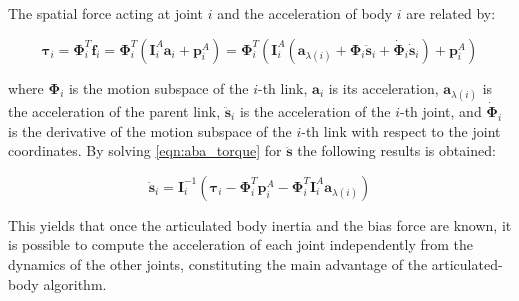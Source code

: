 The spatial force acting at joint $i$ and the acceleration of body $i$ are related by:

\begin{equation}
    \boldsymbol{\tau} _i = \boldsymbol{\Phi} ^T _i \mathbf{f} _i = \boldsymbol{\Phi} ^T _i (\mathbf{I} _i ^A \mathbf{a} _i + \mathbf{p} ^A _i) = \boldsymbol{\Phi} ^T _i (\mathbf{I} _i ^A (\mathbf{a} _{\lambda(i)} + \boldsymbol{\Phi} _i \ddot{\mathbf{s}} _i + \dot{\boldsymbol{\Phi}} _i \dot{\mathbf{s}} _i)+ \mathbf{p} ^A _i)
    \label{eqn:aba_torque}
\end{equation}

where $\boldsymbol{\Phi} _i$ is the motion subspace of the $i$-th link, $\mathbf{a} _i$ is its acceleration, $\mathbf{a} _{\lambda(i)}$ is the acceleration of the parent link, $\ddot{\mathbf{s}} _i$ is the acceleration of the $i$-th joint, and $\dot{\boldsymbol{\Phi}} _i$ is the derivative of the motion subspace of the $i$-th link with respect to the joint coordinates.
By solving \cref{eqn:aba_torque} for $\ddot{\mathbf{s}}$ the following results is obtained:

\begin{equation}
    \ddot{\mathbf{s}} _i = \mathbf{I} _i ^{-1} (\boldsymbol{\tau} _i - \boldsymbol{\Phi} ^T _i \mathbf{p} ^A _i - \boldsymbol{\Phi} ^T _i \mathbf{I} _i ^A \mathbf{a} _{\lambda(i)})
\end{equation}

This yields that once the articulated body inertia and the bias force are known, it is possible to compute the acceleration of each joint independently from the dynamics of the other joints, constituting the main advantage of the articulated-body algorithm.


